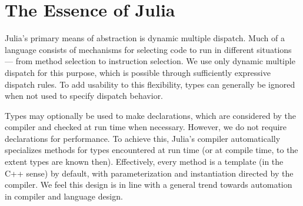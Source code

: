 \documentclass[9pt]{sigplanconf}
\begin{document}


\section{The Essence of Julia}

Julia's primary means of abstraction is dynamic multiple dispatch.
Much of a language consists of mechanisms for selecting
code to run in different situations --- from method selection to
instruction selection. We use only dynamic multiple dispatch for this
purpose, which is possible through sufficiently expressive
dispatch rules. To add usability to this flexibility,
types can generally be ignored when not used to specify dispatch behavior.

Types may optionally be used to make declarations, which are considered by
the compiler and checked at run time when necessary. However, we do not
require declarations for performance. To achieve this, Julia's compiler
automatically specializes methods for types encountered at run time
(or at compile time, to the extent types are known then). Effectively,
every method is a template (in the C++ sense) by default, with
parameterization and instantiation directed by the compiler. We feel this
design is in line with a general trend towards automation in compiler
and language design.
\end{document}
